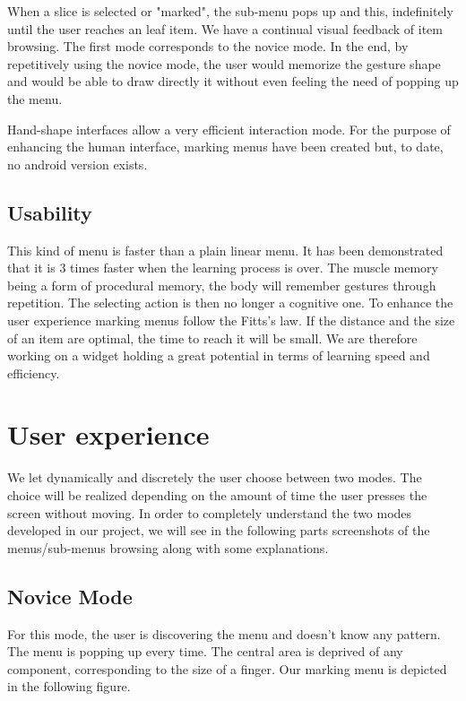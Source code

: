\documentclass[conference]{IEEEtran}
\begin{document}
When a slice is selected or "marked", the sub-menu pops up and this, indefinitely until the user reaches an leaf item. We have a continual visual feedback of item browsing. The first mode corresponds to the novice mode. In the end, by repetitively using the novice mode, the user would memorize the gesture shape and would be able to draw directly it without even feeling the need of popping up the menu.

Hand-shape interfaces allow a very efficient interaction mode. For the purpose of enhancing the human interface, marking menus have been created but, to date, no android version exists.

\subsection{Usability}
This kind of menu is faster than a plain linear menu. It has been demonstrated that it is 3 times faster when the learning process is over. The muscle memory being a form of procedural memory, the body will remember gestures through repetition. The selecting action is then no longer a cognitive one.
To enhance the user experience marking menus follow the Fitts's law. If the distance and the size of an item are optimal, the time to reach it will be small. We are therefore working on a widget holding a great potential in terms of learning speed and efficiency.

\section{User experience}
We let dynamically and discretely the user choose between two modes. The choice will be realized depending on the amount of time the user presses the screen without moving. In order to completely understand the two modes developed in our project, we will see in the following parts screenshots of the menus/sub-menus browsing along with some explanations.

\subsection{Novice Mode}
For this mode, the user is discovering the menu and doesn't know any pattern. The menu is popping up every time. The central area is deprived of any component, corresponding to the size of a finger. Our marking menu is depicted in the following figure.
\end{document}
